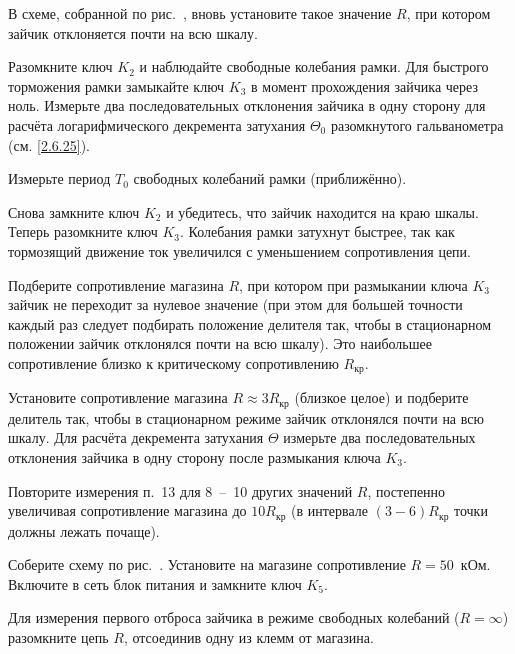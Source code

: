 \begin{lab:task}
	\item В схеме, собранной по рис.~, вновь установите такое значение
$R$, при котором зайчик отклоняется почти на всю шкалу.

	\item Разомкните ключ $K_2$ и наблюдайте свободные
колебания рамки. Для быстрого торможения рамки замыкайте ключ
$K_3$ в момент прохождения зайчика через ноль.
Измерьте два последовательных отклонения зайчика в одну сторону для
расчёта логарифмического декремента затухания $\Theta_0$ разомкнутого гальванометра
(см. \eqref{2.6.25}).

	\item Измерьте период $T_0$ свободных колебаний рамки
(приближённо).

	\item Снова замкните ключ $K_2$ и убедитесь, что
зайчик находится на краю шкалы. Теперь разомкните ключ
$K_3$. Колебания рамки затухнут быстрее, так как
тормозящий движение ток увеличился с уменьшением сопротивления цепи.

	\item Подберите  сопротивление магазина $R$, при
котором при размыкании ключа $K_3$ зайчик не
переходит за нулевое значение (при этом для большей точности каждый раз
следует подбирать положение делителя так, чтобы в стационарном положении
зайчик отклонялся почти на всю шкалу). Это наибольшее сопротивление
близко к критическому сопротивлению $R_{\text{кр}}$.

	\item Установите сопротивление магазина $R \approx 3R_{\text{кр}}$ (близкое целое) и подберите
делитель так, чтобы в стационарном режиме зайчик отклонялся почти на всю
шкалу. Для расчёта декремента затухания $\Theta$ измерьте два последовательных
отклонения зайчика в одну сторону после размыкания ключа $K_3$.

	\item Повторите измерения п.~13 для 8~--~10 других значений $R$,
постепенно увеличивая сопротивление магазина до $10R_{\text{кр}}$ (в интервале $(3-6)R_{\text{кр}}$
точки должны лежать почаще).


	\item Соберите схему по рис.~. Установите на магазине сопротивление
$R=50$~кОм. Включите в сеть блок питания и замкните ключ
$K_5$.

	\item Для измерения первого отброса зайчика в режиме свободных колебаний
($R = \infty$) разомкните цепь $R$, отсоединив одну из клемм от магазина.


\end{lab:task}
